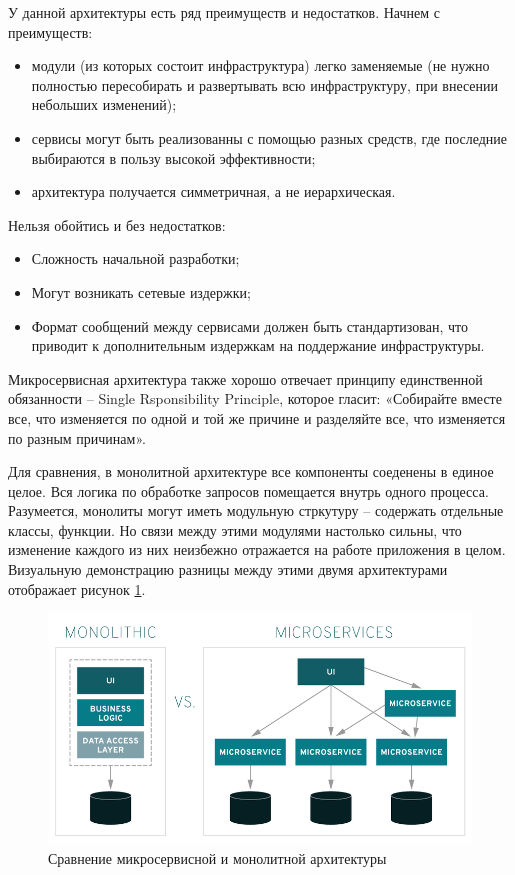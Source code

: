 У данной архитектуры есть ряд преимуществ и недостатков. Начнем с преимуществ:
\begin{itemize}
    \item модули (из которых состоит инфраструктура) легко заменяемые (не нужно
        полностью пересобирать и развертывать всю инфраструктуру, при внесении
        небольших изменений);
    \item сервисы могут быть реализованны с помощью разных средств, где
        последние выбираются в пользу высокой эффективности;
    \item архитектура получается симметричная, а не иерархическая.
\end{itemize}

Нельзя обойтись и без недостатков:
\begin{itemize}
    \item Сложность начальной разработки;
    \item Могут возникать сетевые издержки;
    \item Формат сообщений между сервисами должен быть стандартизован, что
        приводит к дополнительным издержкам на поддержание инфраструктуры.
\end{itemize}

Микросервисная архитектура также хорошо отвечает принципу единственной
обязанности -- Single Rsponsibility Principle\cite{microserv}, которое гласит:
«Собирайте вместе все, что изменяется по одной и той же причине и разделяйте
все, что изменяется по разным причинам».

Для сравнения, в монолитной архитектуре все компоненты соеденены в единое целое.
Вся логика по обработке запросов помещается внутрь одного процесса. Разумеется,
монолиты могут иметь модульную стркутуру -- содержать отдельные классы, функции.
Но связи между этими модулями настолько сильны, что изменение каждого из них
неизбежно отражается на работе приложения в целом. Визуальную демонстрацию
разницы между этими двумя архитектурами отображает рисунок \ref{fig:mon-vs-micr}.
\begin{figure}[H]
    \centering
    \includegraphics[scale=0.55]{inc/img/Monolithic-vs-microservices.png}
    \caption{Сравнение микросервисной и монолитной архитектуры}
    \label{fig:mon-vs-micr}
\end{figure}


